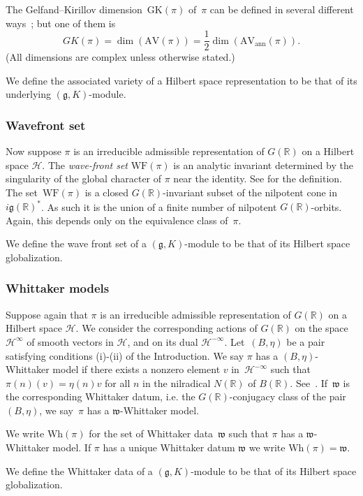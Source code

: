 \documentclass[10pt,leqno]{article}
\numberwithin{equation}{section}
\newcommand{\mH}{\mathcal H}
\newcommand{\R}{\mathbb R}
\newcommand{\g}{\mathfrak g}
\newcommand{\w}{\mathfrak w}
\newcommand{\AV}{\mathrm{AV}}
\newcommand{\Wh}{\mathrm{Wh}}
\newcommand{\WF}{\mathrm{WF}}
\newcommand{\AVann}{\mathrm{AV}_{\mathrm{ann}}}
\newcommand{\GK}{\mathrm{GK}}
\begin{document}
The Gelfand--Kirillov dimension~$\GK(\pi)$ of~$\pi$ can be defined in several different ways~\cite{vogan-gelfand-kirillov}; but one of them is
$$
GK(\pi)=\dim(\AV(\pi))=\frac12\dim(\AVann(\pi)).
$$
(All dimensions are complex unless otherwise stated.)


We define the associated variety of a Hilbert space representation to be that of  its underlying $(\g,K)$-module.


\subsubsection*{Wavefront set}

Now suppose $\pi$ is an irreducible admissible representation of $G(\R)$ on a Hilbert space $\mH$. 
The \emph{wave-front
  set} $\WF(\pi)$ is an analytic invariant determined by the
singularity of the global character of $\pi$ near the identity. See \cite{howe_wave_front, bv_local_structure, HarrisHeOlafsson} for the definition. 
The set~$\WF(\pi)$  is a closed $G(\R)$-invariant subset of the nilpotent cone in
$i\g(\R)^*$. As such it is the union of a finite number of nilpotent $G(\R)$-orbits. Again, this depends only on the equivalence class of~$\pi$.

We define the wave front set of a $(\g,K)$-module to be that of its 
Hilbert space globalization. 

\subsubsection*{Whittaker models}

Suppose again that $\pi$ is an irreducible admissible representation of $G(\R)$ on a Hilbert space $\mH$. We consider the corresponding actions of $G(\R)$ on the space~$\mH^\infty$ of smooth vectors in $\mH$, and on its dual $\mH^{-\infty}$. Let~$(B, \eta)$ be a pair satisfying conditions (i)-(ii) of the Introduction. We say $\pi$ has a $(B,\eta)$-Whittaker model
if there exists a nonzero element $v$ in~$\mH^{-\infty}$ such that $\pi(n)(v)=\eta(n)v$ for all $n$ in the nilradical $N(\R)$ of $B(\R)$. See~\cite{matumoto}. If~$\w$ is the corresponding Whittaker datum, i.e. the $G(\R)$-conjugacy class of the pair $(B, \eta)$, we say~$\pi$ has a $\w$-Whittaker model.  

We write $\Wh(\pi)$ for the set of Whittaker data~$\w$ such that $\pi$ has a $\w$-Whittaker model.
If $\pi$ has a unique Whittaker datum $\w$ we write $\Wh(\pi)=\w$.

We define the Whittaker data  of a $(\g,K)$-module to be that of its 
Hilbert space globalization.
\end{document}
